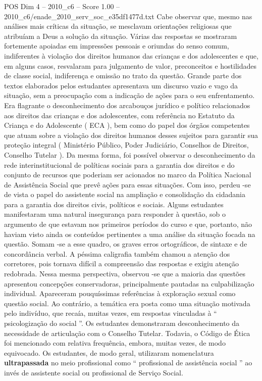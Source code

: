 \begin{textsample}{POS Dim 4 – 2010\_c6 – Score 1.00 – 2010\_c6/enade\_2010\_serv\_soc\_e35df1477d.txt}
Cabe observar que, mesmo nas análises mais críticas da situação, se mesclavam orientações religiosas que atribuíam a Deus a solução da situação.
Várias das respostas se mostraram fortemente apoiadas em impressões pessoais e oriundas do senso comum, indiferentes à violação dos direitos humanos das crianças e dos adolescentes e que, em alguns casos, resvalaram para julgamento de valor, preconceitos e hostilidades de classe social, indiferença e omissão no trato da questão.
Grande parte dos textos elaborados pelos estudantes apresentava um discurso vazio e vago da situação, sem a preocupação com a indicação de ações para o seu enfrentamento.
Era flagrante o desconhecimento dos arcabouços jurídico e político relacionados aos direitos das crianças e dos adolescentes, com referência no Estatuto da Criança e do Adolescente ( ECA ), bem como do papel dos órgãos competentes que atuam sobre a violação dos direitos humanos desses sujeitos para garantir sua proteção integral ( Ministério Público, Poder Judiciário, Conselhos de Direitos, Conselho Tutelar ).
Da mesma forma, foi possível observar o desconhecimento da rede interinstitucional de políticas sociais para a garantia dos direitos e do conjunto de recursos que poderiam ser acionados no marco da Política Nacional de Assistência Social que prevê ações para essas situações.
Com isso, perdeu -se de vista o papel do assistente social na ampliação e consolidação da cidadania para a garantia dos direitos civis, políticos e sociais.
Alguns estudantes manifestaram uma natural insegurança para responder à questão, sob o argumento de que estavam nos primeiros períodos do curso e que, portanto, não haviam visto ainda os conteúdos pertinentes a uma análise da situação focada na questão.
Somam -se a esse quadro, os graves erros ortográficos, de sintaxe e de concordância verbal.
A péssima caligrafia também chamou a atenção dos corretores, pois tornava difícil a compreensão das respostas e exigiu atenção redobrada.
Nessa mesma perspectiva, observou -se que a maioria das questões apresentou concepções conservadoras, principalmente pautadas na culpabilização individual.
Apareceram pouquíssimas referências à exploração sexual como questão social.
Ao contrário, a temática era posta como uma situação motivada pelo indivíduo, que recaía, muitas vezes, em respostas vinculadas à “ psicologização do social ”.
Os estudantes demonstraram desconhecimento da necessidade de articulação com o Conselho Tutelar.
Todavia, o Código de Ética foi mencionado com relativa frequência, embora, muitas vezes, de modo equivocado.
Os estudantes, de modo geral, utilizaram nomenclatura \textbf{ultrapassada} no meio profissional como “ profissional de assistência social ” ao invés de assistente social ou profissional de Serviço Social.

\end{textsample}
